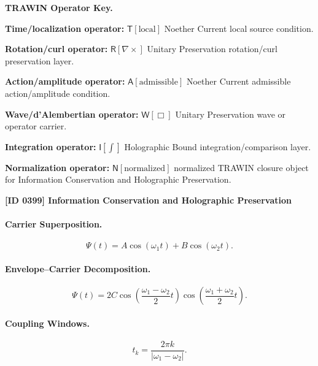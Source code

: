 \par\vspace{0.45\baselineskip}
\noindent\begin{minipage}[t]{\linewidth}
\begingroup
\small
\raggedright
\textbf{TRAWIN Operator Key.}\par
\noindent\textbf{Time/localization operator:} $\mathsf{T}\!\left[\mathrm{local}\right]$ Noether Current local source condition.\par
\noindent\textbf{Rotation/curl operator:} $\mathsf{R}\!\left[\nabla\times\right]$ Unitary Preservation rotation/curl preservation layer.\par
\noindent\textbf{Action/amplitude operator:} $\mathsf{A}\!\left[\mathrm{admissible}\right]$ Noether Current admissible action/amplitude condition.\par
\noindent\textbf{Wave/d'Alembertian operator:} $\mathsf{W}\!\left[\Box\right]$ Unitary Preservation wave or operator carrier.\par
\noindent\textbf{Integration operator:} $\mathsf{I}\!\left[\int\right]$ Holographic Bound integration/comparison layer.\par
\noindent\textbf{Normalization operator:} $\mathsf{N}\!\left[\mathrm{normalized}\right]$ normalized TRAWIN closure object for Information Conservation and Holographic Preservation.\par
\endgroup
\end{minipage}

\clearpage
\noindent\textbf{[ID 0399] Information Conservation and Holographic Preservation}\par
\vspace{0.35em}
\paragraph{Carrier Superposition.}
\begin{equation}
\Psi(t)=A\cos(\omega_1t)+B\cos(\omega_2t).
\end{equation}

\paragraph{Envelope--Carrier Decomposition.}
\begin{equation}
\Psi(t)
=
2C
\cos\left(
\frac{\omega_1-\omega_2}{2}t
\right)
\cos\left(
\frac{\omega_1+\omega_2}{2}t
\right).
\end{equation}

\paragraph{Coupling Windows.}
\begin{equation}
t_k=
\frac{2\pi k}{|\omega_1-\omega_2|}.
\end{equation}

